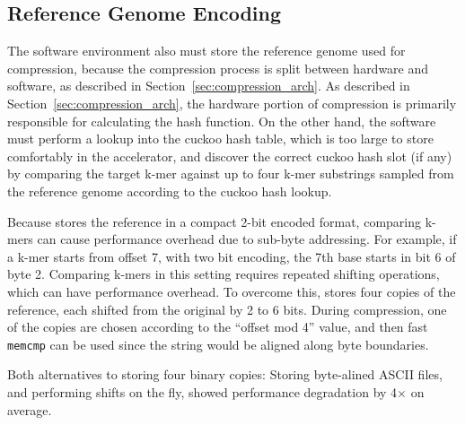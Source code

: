 \subsection{Reference Genome Encoding}

The software environment also must store the reference genome used for compression, because the compression process is split between hardware and software, as described in Section~\ref{sec:compression_arch}.
As described in Section~\ref{sec:compression_arch}, the hardware portion of compression is primarily responsible for calculating the hash function.
On the other hand, the software must perform a lookup into the cuckoo hash table, which is too large to store comfortably in the accelerator, and discover the correct cuckoo hash slot (if any) by comparing the target k-mer against up to four k-mer substrings sampled from the reference genome according to the cuckoo hash lookup.

Because \name{} stores the reference in a compact 2-bit encoded format, comparing k-mers can cause performance overhead due to sub-byte addressing.
For example, if a k-mer starts from offset 7, with two bit encoding, the 7th base starts in bit 6 of byte 2.
Comparing k-mers in this setting requires repeated shifting operations, which can have performance overhead.
To overcome this, \name{} stores four copies of the reference, each shifted from the original by 2 to 6 bits.
During compression, one of the copies are chosen according to the ``offset mod 4'' value, and then fast \texttt{memcmp} can be used since the string would be aligned along byte boundaries.

Both alternatives to storing four binary copies: Storing byte-alined ASCII files, and performing shifts on the fly, showed performance degradation by 4$\times$ on average.

